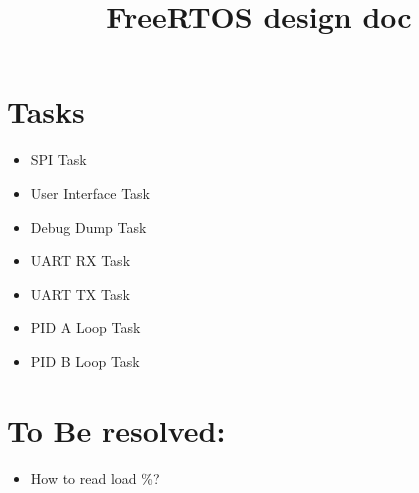 \documentclass[a4paper,11pt]{article}
\begin{document}
\title{FreeRTOS design doc}
\date{}
\maketitle
\vspace{-2cm}


\section*{Tasks}

\begin{itemize}
	\item SPI Task
	\item User Interface Task
	\item Debug Dump Task
	\item UART RX Task
	\item UART TX Task	
	\item PID A Loop Task
	\item PID B Loop Task
\end{itemize}


\section*{To Be resolved:}

\begin{itemize}
	\item How to read load \%?
\end{itemize}
\end{document}
